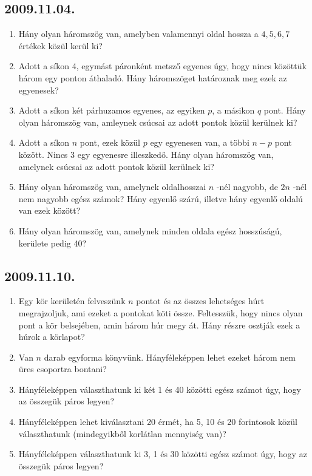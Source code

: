 \subsection*{2009.11.04.}
\begin{enumerate}
\item Hány olyan háromszög van, amelyben valamennyi oldal hossza a $4,5,6,7$ értékek közül kerül ki?
\item Adott a síkon 4, egymást páronként metsző egyenes úgy, hogy nincs közöttük három egy ponton áthaladó. Hány háromszöget határoznak meg ezek az egyenesek?
\item Adott a síkon két párhuzamos egyenes, az egyiken $p$, a másikon $q$ pont. Hány olyan háromszög van, amleynek csúcsai az adott pontok közül kerülnek ki?
\item Adott a síkon $n$ pont, ezek közül $p$ egy egyenesen van, a többi $n-p$ pont között. Nincs 3 egy egyenesre illeszkedő. Hány olyan háromszög van, amelynek csúcsai az adott pontok közül kerülnek ki?
\item Hány olyan háromszög van, amelynek oldalhosszai $n$ -nél nagyobb, de $2n$ -nél nem nagyobb egész számok? Hány egyenlő szárú, illetve hány egyenlő oldalú van ezek között?
\item Hány olyan háromszög van, amelynek minden oldala egész hosszúságú, kerülete pedig 40?
\end{enumerate}

\subsection*{2009.11.10.}
\begin{enumerate}
\item Egy kör kerületén felveszünk $n$ pontot és az összes lehetséges húrt megrajzoljuk, ami ezeket a pontokat köti össze. Feltesszük, hogy nincs olyan pont a kör belsejében, amin három húr megy át. Hány részre osztják ezek a húrok a körlapot?
\item Van $n$ darab egyforma könyvünk. Hányféleképpen lehet ezeket három nem üres csoportra bontani?
\item Hányféleképpen választhatunk ki két 1 és 40 közötti egész számot úgy, hogy az összegük páros legyen?
\item Hányféleképpen lehet kiválasztani 20 érmét, ha 5,  10 és 20 forintosok közül választhatunk (mindegyikből korlátlan mennyiség van)?
\item Hányféleképpen választhatunk ki 3, 1 és 30 közötti egész számot úgy, hogy az összegük páros legyen?
\end{enumerate}

